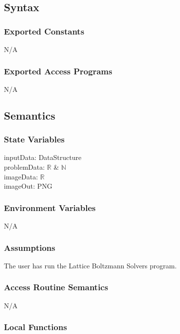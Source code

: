 \documentclass[12pt, titlepage]{article}
\newcommand{\famname}{Lattice Boltzmann Solvers}
\begin{document}
\subsection{Syntax}

\subsubsection{Exported Constants}
N/A

\subsubsection{Exported Access Programs}
N/A

\subsection{Semantics}

\subsubsection{State Variables}
inputData: DataStructure\\
problemData: $\mathbb{R}$ \& $\mathbb{N}$ \\ 
imageData: $\mathbb{R}$\\
imageOut: PNG\\


\subsubsection{Environment Variables}

N/A

\subsubsection{Assumptions}

The user has run the {\famname} program.  

\subsubsection{Access Routine Semantics}

N/A

\subsubsection{Local Functions}
\end{document}
